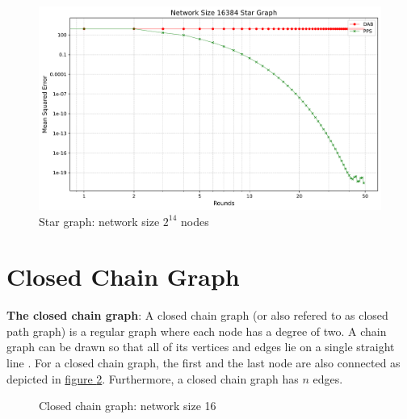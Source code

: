 \begin{figure}[H]
    \centering
    \includegraphics[scale=0.5]{figures/starGraphSimulations/DAB_vs_PPS_SG_r50_n16384.png}
    \caption{Star graph: network size $2^{14}$ nodes}
    \label{fig:16384StarGraph}
\end{figure}

\section{Closed Chain Graph}
\textbf{The closed chain graph}: A closed chain graph (or also refered to as closed path graph) is a regular graph where each node has a degree of two. A chain graph can be drawn so that all of its vertices and edges lie on a single straight line \cite{gross1998graph}. For a closed chain graph, the first and the last node are also connected as depicted in \hyperref[fig:closedChainGraphDemo]{figure } \ref{fig:closedChainGraphDemo}. Furthermore, a closed chain graph has $n$ edges.
\begin{figure}[H]
    \centering
    \scalebox{0.8}{}
    \caption{Closed chain graph: network size 16}
    \label{fig:closedChainGraphDemo}
\end{figure}
